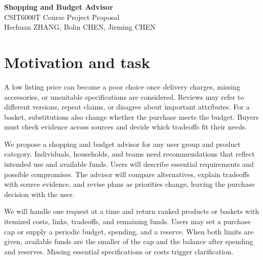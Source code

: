 \documentclass[11pt,letterpaper]{article}
\begin{document}
\begin{center}
{\fontsize{17}{19}\selectfont\bfseries Shopping and Budget Advisor}\\[2pt]
{\fontsize{10.5}{12}\selectfont CSIT6000T Course Project Proposal}\\[1pt]
{\fontsize{10.5}{12}\selectfont Hechuan ZHANG, Bolin CHEN, Jieming CHEN}
\end{center}
\vspace{-8pt}

\section{Motivation and task}
A low listing price can become a poor choice once delivery charges, missing accessories, or unsuitable specifications are considered. Reviews may refer to different versions, repeat claims, or disagree about important attributes. For a basket, substitutions also change whether the purchase meets the budget. Buyers must check evidence across sources and decide which tradeoffs fit their needs.

We propose a shopping and budget advisor for any user group and product category. Individuals, households, and teams need recommendations that reflect intended use and available funds. Users will describe essential requirements and possible compromises. The advisor will compare alternatives, explain tradeoffs with source evidence, and revise plans as priorities change, leaving the purchase decision with the user.

We will handle one request at a time and return ranked products or baskets with itemized costs, links, tradeoffs, and remaining funds. Users may set a purchase cap or supply a periodic budget, spending, and a reserve. When both limits are given, available funds are the smaller of the cap and the balance after spending and reserves. Missing essential specifications or costs trigger clarification.
\end{document}
